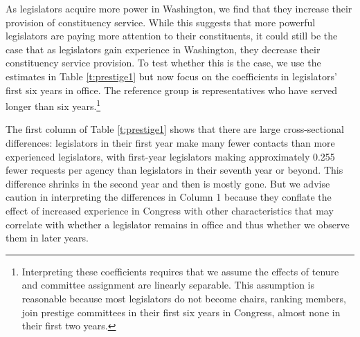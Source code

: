 \documentclass[12pt]{article}
\begin{document}
As legislators acquire more power in Washington, we find that they increase their provision of constituency service. While this suggests that more powerful legislators are paying more attention to their constituents, it could still be the case that as legislators gain experience in Washington, they decrease their constituency service provision. To test whether this is the case, we use the estimates in Table \ref{t:prestige1} but now focus on the coefficients in legislators' first six years in office. The reference group is representatives who have served longer than six years.\footnote{Interpreting these coefficients requires that we assume the effects of tenure and committee assignment are linearly separable. This assumption is reasonable because most legislators do not become chairs, ranking members, join prestige committees in their first six years in Congress, almost none in their first two years.} 


The first column of Table \ref{t:prestige1} shows that there are large cross-sectional differences: legislators in their first year make many fewer contacts than more experienced legislators, with first-year legislators making approximately 0.255 fewer requests per agency than legislators in their seventh year or beyond. This difference shrinks in the second year and then is mostly gone. But we advise caution in interpreting the differences in Column 1 because they conflate the effect of increased experience in Congress with other characteristics that may correlate with whether a legislator remains in office and thus whether we observe them in later years.   




\end{document}
